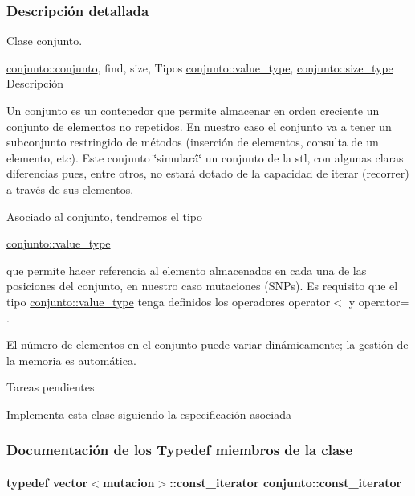 \subsubsection{Descripción detallada}
Clase conjunto. 

\hyperlink{classconjunto_a16d987f42c679efab01748178ba45891}{conjunto\+::conjunto}, find, size, Tipos \hyperlink{classconjunto_ad902faf0206fe6aa37e39d8e6e5a880a}{conjunto\+::value\+\_\+type}, \hyperlink{classconjunto_a855a5893bb0f5a851ab2dbf2b8aa6cc7}{conjunto\+::size\+\_\+type} Descripción

Un conjunto es un contenedor que permite almacenar en orden creciente un conjunto de elementos no repetidos. En nuestro caso el conjunto va a tener un subconjunto restringido de métodos (inserción de elementos, consulta de un elemento, etc). Este conjunto \char`\"{}simulará\char`\"{} un conjunto de la stl, con algunas claras diferencias pues, entre otros, no estará dotado de la capacidad de iterar (recorrer) a través de sus elementos.

Asociado al conjunto, tendremos el tipo
\begin{DoxyCode}
\hyperlink{classconjunto_ad902faf0206fe6aa37e39d8e6e5a880a}{conjunto::value\_type} 
\end{DoxyCode}
 que permite hacer referencia al elemento almacenados en cada una de las posiciones del conjunto, en nuestro caso mutaciones (S\+N\+Ps). Es requisito que el tipo \hyperlink{classconjunto_ad902faf0206fe6aa37e39d8e6e5a880a}{conjunto\+::value\+\_\+type} tenga definidos los operadores operator$<$ y operator= .

El número de elementos en el conjunto puede variar dinámicamente; la gestión de la memoria es automática.

\begin{DoxyRefDesc}{Tareas pendientes}
\item[\hyperlink{todo__todo000005}{Tareas pendientes}]Implementa esta clase siguiendo la especificación asociada \end{DoxyRefDesc}


\subsubsection{Documentación de los \textquotesingle{}Typedef\textquotesingle{} miembros de la clase}
\paragraph[{\texorpdfstring{const\+\_\+iterator}{const_iterator}}]{\setlength{\rightskip}{0pt plus 5cm}typedef vector$<$mutacion$>$\+::{\bf const\+\_\+iterator} {\bf conjunto\+::const\+\_\+iterator}}\hypertarget{classconjunto_aa3cf9f1ee3fc1682b221c33d9f271e2e}{}\label{classconjunto_aa3cf9f1ee3fc1682b221c33d9f271e2e}
